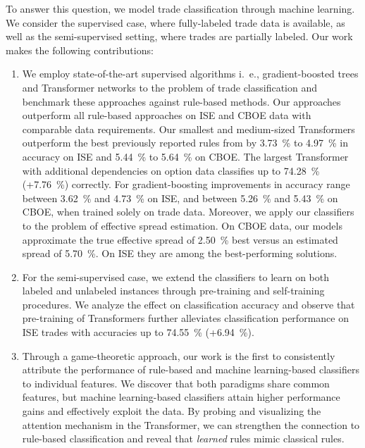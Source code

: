 To answer this question, we model trade classification through machine learning. We consider the supervised case, where fully-labeled trade data is available, as well as the semi-supervised setting, where trades are partially labeled. Our work makes the following contributions:
\begin{enumerate}[label=(\roman*),noitemsep]
    \item We employ state-of-the-art supervised algorithms i.~e., gradient-boosted trees and Transformer networks to the problem of trade classification and benchmark these approaches against rule-based methods. Our approaches outperform all rule-based approaches on \gls{ISE} and \gls{CBOE} data with comparable data requirements. Our smallest and medium-sized Transformers outperform the best previously reported rules from \textcite[\checkmark][13--15]{grauerOptionTradeClassification2022} by \SI{3.73}{\percent} to \SI{4.97}{\percent} in accuracy on \gls{ISE} and \SI{5.44}{\percent} to \SI{5.64}{\percent} on \gls{CBOE}. The largest Transformer with additional dependencies on option data classifies up to \SI{74.28}{\percent} (+\SI{7.76}{\percent}) correctly. For gradient-boosting improvements in accuracy range between \SI{3.62}{\percent} and \SI{4.73}{\percent} on \gls{ISE}, and between \SI{5.26}{\percent} and \SI{5.43}{\percent} on \gls{CBOE}, when trained solely on trade data. Moreover, we apply our classifiers to the problem of effective spread estimation. On \gls{CBOE} data, our models approximate the true effective spread of \SI{2.50}{\percent} best versus an estimated spread of \SI{5.70}{\percent}. On \gls{ISE} they are among the best-performing solutions.
    \item For the semi-supervised case, we extend the classifiers to learn on both labeled and unlabeled instances through pre-training and self-training procedures. We analyze the effect on classification accuracy and observe that pre-training of Transformers further alleviates classification performance on \gls{ISE} trades with accuracies up to \SI{74.55}{\percent} (+\SI{6.94}{\percent}).
    \item Through a game-theoretic approach, our work is the first to consistently attribute the performance of rule-based and machine learning-based classifiers to individual features. We discover that both paradigms share common features, but machine learning-based classifiers attain higher performance gains and effectively exploit the data. By probing and visualizing the attention mechanism in the Transformer, we can strengthen the connection to rule-based classification and reveal that \emph{learned} rules mimic classical rules.
\end{enumerate}

